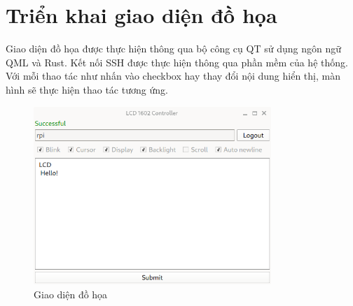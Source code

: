 \documentclass{report}
\begin{document}
\section{Triển khai giao diện đồ họa}
Giao diện đồ họa được thực hiện thông qua bộ công cụ QT sử dụng ngôn ngữ QML và Rust. Kết nối SSH được thực hiện thông qua phần mềm của hệ thống. Với mỗi thao tác như nhấn vào checkbox hay thay đổi nội dung hiển thị, màn hình sẽ thực hiện thao tác tương ứng.
\begin{figure}[H]
	\centering
	\includegraphics[width=0.8\textwidth]{../images/gui.png}
	\caption{Giao diện đồ họa}
\end{figure}
\end{document}
